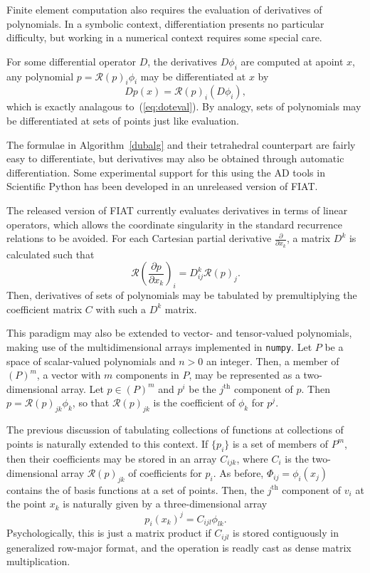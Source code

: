 Finite element computation also requires the evaluation of derivatives 
of polynomials.  In a symbolic context, differentiation presents no
particular difficulty, but working in a numerical context requires
some special care.

For some differential operator \( D \), the derivatives
\( D \phi_i \) are computed at apoint \( x \), any polynomial
\( p = \mathcal{R}(p)_i \phi_i \) may be differentiated at \( x \) by
\[
Dp(x) = \mathcal{R}(p)_i (D\phi_i),
\]
which is exactly analagous to~(\ref{eq:doteval}).  By analogy, sets of
polynomials may be differentiated at sets of points just like
evaluation.

The formulae in Algorithm~\ref{dubalg} and their tetrahedral counterpart are
fairly easy to differentiate, but derivatives may also be obtained through
automatic differentiation.  Some experimental support for this using
the AD tools in Scientific Python has been developed in an unreleased
version of FIAT.  

The released version of FIAT currently evaluates derivatives in terms
of linear operators, which allows the coordinate singularity in the
standard recurrence relations to be avoided.  For each Cartesian
partial derivative \( \frac{\partial}{\partial x_k} \), a matrix \(
D^k \) is calculated such that
\[
\mathcal{R}\left(\frac{\partial p}{\partial x_k}\right)_i
= D^k_{ij} \mathcal{R}(p)_j.
\]
Then, derivatives of sets of polynomials may be tabulated by
premultiplying the coefficient matrix \( C \) with such a \( D^k \) matrix.

This paradigm may also be extended to vector- and tensor-valued
polynomials, making use of the multidimensional arrays implemented in
\texttt{numpy}.  Let \( P \) be a space of scalar-valued polynomials and
\( n > 0 \) an integer.  Then, a member of \( (P)^m \), a vector with
\( m \) components in \( P \), may be represented as a two-dimensional
array.  Let \( p \in (P)^m \) and \( p^i \) be the \( j^\mathrm{th} \)
component of \( p \).  Then \( p = \mathcal{R}(p)_{jk} \phi_k \), so
that \( \mathcal{R}(p)_{jk} \) is the coefficient of \( \phi_k \) for
\( p^j \).  

The previous discussion of tabulating collections of functions at
collections of points is naturally extended to this context.  If \( \{
p_i \} \) is a set of members of \( P^m \), then their coefficients
may be stored in an array \( C_{ijk} \), where \( C_i \) is the
two-dimensional array \( \mathcal{R}(p)_{jk} \) of coefficients for \(
p_i \).  As before, \( \Phi_{ij} = \phi_i(x_j) \) contains the of
basis functions at a set of points.  Then, the \( j^\mathrm{th} \)
component of \( v_i \) at the point \( x_k \) is naturally given by a
three-dimensional array
\[
p_i(x_k)^j = C_{ijl} \phi_{lk}.
\]
Psychologically, this is just a matrix product if \( C_{ijl} \)
is stored contiguously in generalized row-major format, and the
operation is readly cast as dense matrix multiplication.  

